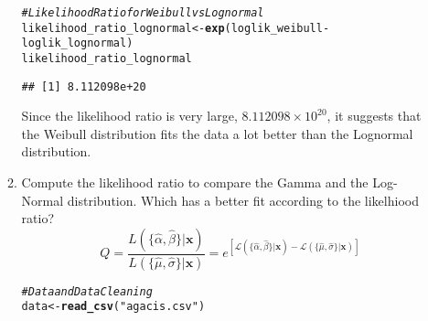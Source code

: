 \documentclass{article}\usepackage[]{graphicx}\usepackage[]{xcolor}
\makeatletter
\newcommand{\hlsng}[1]{\textcolor[rgb]{0.192,0.494,0.8}{#1}}%
\newcommand{\hlcom}[1]{\textcolor[rgb]{0.678,0.584,0.686}{\textit{#1}}}%
\newcommand{\hlopt}[1]{\textcolor[rgb]{0,0,0}{#1}}%
\newcommand{\hldef}[1]{\textcolor[rgb]{0.345,0.345,0.345}{#1}}%
\newcommand{\hlkwb}[1]{\textcolor[rgb]{0.69,0.353,0.396}{#1}}%
\newcommand{\hlkwd}[1]{\textcolor[rgb]{0.737,0.353,0.396}{\textbf{#1}}}%
\newenvironment{kframe}{%
 \def\at@end@of@kframe{}%
 \ifinner\ifhmode%
  \def\at@end@of@kframe{\end{minipage}}%
  \begin{minipage}{\columnwidth}%
 \fi\fi%
 \def\FrameCommand##1{\hskip\@totalleftmargin \hskip-\fboxsep
 \colorbox{shadecolor}{##1}\hskip-\fboxsep
     \hskip-\linewidth \hskip-\@totalleftmargin \hskip\columnwidth}%
 \MakeFramed {\advance\hsize-\width
   \@totalleftmargin\z@ \linewidth\hsize
   \@setminipage}}%
 {\par\unskip\endMakeFramed%
 \at@end@of@kframe}
\newenvironment{knitrout}{}{} %
\makeatother
\begin{document}
\begin{enumerate}
\begin{enumerate}
\begin{knitrout}
\begin{kframe}
\begin{alltt}
\hlcom{# Likelihood Ratio for Weibull vs Lognormal}
\hldef{likelihood_ratio_lognormal} \hlkwb{<-} \hlkwd{exp}\hldef{(loglik_weibull} \hlopt{-} \hldef{loglik_lognormal)}
\hldef{likelihood_ratio_lognormal}
\end{alltt}
\begin{verbatim}
## [1] 8.112098e+20
\end{verbatim}
\end{kframe}
\end{knitrout}

Since the likelihood ratio is very large, $8.112098 \times 10^{20}$, it suggests that the Weibull distribution fits the data a lot better than the Lognormal distribution. 

    \item Compute the likelihood ratio to compare the Gamma and the Log-Normal distribution.
    Which has a better fit according to the likelhiood ratio?
    \[Q = \frac{L(\{\hat{\alpha}, \hat{\beta}\}|\mathbf{x})}{L(\{\hat{\mu}, \hat{\sigma}\}|\mathbf{x})}=e^{\left[\mathcal{L}(\{\hat{\alpha}, \hat{\beta}\}|\mathbf{x}) - \mathcal{L}(\{\hat{\mu}, \hat{\sigma}\}|\mathbf{x})\right]}\]

\begin{knitrout}
\color{fgcolor}\begin{kframe}
\begin{alltt}
\hlcom{#Data and Data Cleaning}
\hldef{data} \hlkwb{<-} \hlkwd{read_csv}\hldef{(}\hlsng{"agacis.csv"}\hldef{)}
\end{alltt}



\end{kframe}
\end{knitrout}
\end{enumerate}
\end{enumerate}
\end{document}
